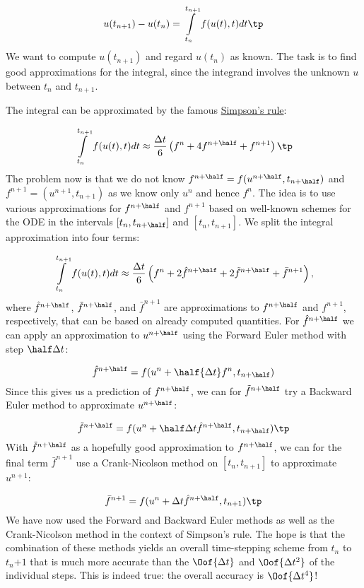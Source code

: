 \documentclass[graybox,sectrefs,envcountresetchap,open=right,final]{svmonodo}
\begin{document}
\[ u(t_{n+1}) - u(t_n) = \int\limits_{t_{n}}^{t_{n+1}} f(u(t),t)dt\tp \]
We want to compute $u(t_{n+1})$ and regard $u(t_n)$ as known.
The task is to find good approximations for the integral, since the
integrand involves the unknown $u$ between $t_n$ and $t_{n+1}$.

The integral can be approximated by the famous
\href{{http://en.wikipedia.org/wiki/Simpson's_rule}}{Simpson's rule}:

\[ \int\limits_{t_{n}}^{t_{n+1}} f(u(t),t)dt
\approx \frac{\Delta t}{6}\left( f^n + 4f^{n+\half} + f^{n+1}\right)\tp\]
The problem now is that we do not know $f^{n+\half}=f(u^{n+\half},t_{n+\half})$
and $f^{n+1}=(u^{n+1},t_{n+1})$ as we know only $u^n$ and hence $f^n$.
The idea is to use various approximations for $f^{n+\half}$ and
$f^{n+1}$ based on well-known schemes for the ODE in the
intervals $[t_n,t_{n+\half}]$ and $[t_n, t_{n+1}]$.
We split the integral approximation into four terms:

\[ \int\limits_{t_{n}}^{t_{n+1}} f(u(t),t)dt
\approx \frac{\Delta t}{6}\left( f^n + 2\hat{f}^{n+\half}
+ 2\tilde{f}^{n+\half} + \bar{f}^{n+1}\right),\]
where $\hat{f}^{n+\half}$, $\tilde{f}^{n+\half}$, and $\bar{f}^{n+1}$
are approximations to $f^{n+\half}$ and
$f^{n+1}$, respectively, that can be based on already computed quantities.
For $\hat{f}^{n+\half}$ we can apply
an approximation to $u^{n+\half}$ using the Forward Euler
method with step $\half\Delta t$:

\begin{equation}
\hat{f}^{n+\half} = f(u^n + \half{\Delta t} f^n, t_{n+\half})
\label{decay:fd2:RK4:hatf}
\end{equation}
Since this gives us a prediction of $f^{n+\half}$, we can for
$\tilde{f}^{n+\half}$ try a Backward Euler method to approximate $u^{n+\half}$:

\begin{equation}
\tilde{f}^{n+\half} = f(u^n + \half\Delta t\hat{f}^{n+\half}, t_{n+\half})\tp
\label{decay:fd2:RK4:tildef}
\end{equation}
With $\tilde{f}^{n+\half}$ as a hopefully good approximation to
$f^{n+\half}$, we can for the final term $\bar{f}^{n+1}$ use
a Crank-Nicolson method on $[t_n, t_{n+1}]$ to approximate $u^{n+1}$:

\begin{equation}
\bar{f}^{n+1} = f(u^n + \Delta t \hat{f}^{n+\half}, t_{n+1})\tp
\label{decay:fd2:RK4:barf}
\end{equation}
We have now used the Forward and Backward Euler methods as well as the
Crank-Nicolson method in the context of Simpson's rule. The hope is
that the combination of these methods yields an overall time-stepping
scheme from $t_n$ to $t_n{+1}$ that is much more accurate than the
$\Oof{\Delta t}$ and $\Oof{\Delta t^2}$ of the individual steps.
This is indeed true: the overall accuracy is $\Oof{\Delta t^4}$!
\end{document}

